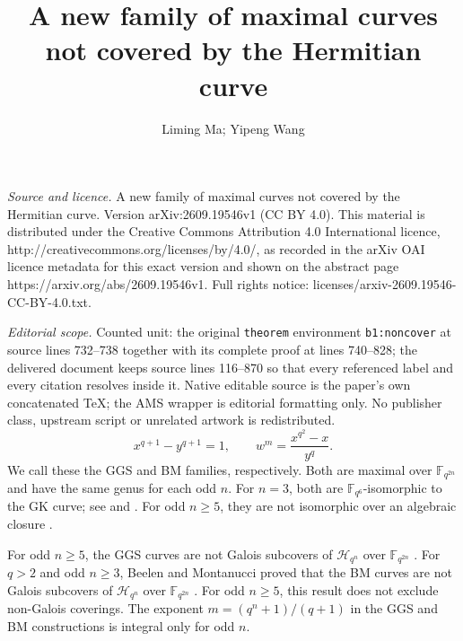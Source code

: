 \documentclass[10pt,a4paper]{amsart}
\numberwithin{equation}{section}
\newcommand{\F}{\mathbb F}
\begin{document}
\title[A new family of maximal curves not covered by the Hermitian ]{A new family of maximal curves not covered by the Hermitian curve}
\author{Liming Ma; Yipeng Wang}
\date{}
\maketitle
\noindent\emph{Source and licence.} A new family of maximal curves not covered by the Hermitian curve. Version arXiv:2609.19546v1 (CC BY 4.0). This material is distributed under the Creative Commons Attribution 4.0 International licence, http://creativecommons.org/licenses/by/4.0/, as recorded in the arXiv OAI licence metadata for this exact version and shown on the abstract page https://arxiv.org/abs/2609.19546v1. Full rights notice: licenses/arxiv-2609.19546-CC-BY-4.0.txt.\par\smallskip
\noindent\textit{Editorial scope.} Counted unit: the original \texttt{theorem} environment \texttt{b1:noncover} at source lines 732--738 together with its complete proof at lines 740--828; the delivered document keeps source lines 116--870 so that every referenced label and every citation resolves inside it. Native editable source is the paper's own concatenated TeX; the AMS wrapper is editorial formatting only. No publisher class, upstream script or unrelated artwork is redistributed.
\begin{equation}
\label{b1:bm-model}
 x^{q+1}-y^{q+1}=1,\qquad w^m=\frac{x^{q^2}-x}{y^q}.
\end{equation}
We call these the GGS and BM families, respectively. Both are
maximal over \(\F_{q^{2n}}\) and have the same genus for each odd
\(n\). For \(n=3\), both are \(\F_{q^6}\)-isomorphic to the
GK curve; see \cite[Remark~2.1]{GGS2010} and
\cite[Section~2]{BM2018}.
For odd \(n\ge5\), they are not isomorphic over an algebraic closure
\cite[Corollary~2.6 and Remark~4.5]{BM2018}.

For odd \(n\ge5\), the GGS curves are not Galois subcovers of
\(\mathcal H_{q^n}\) over \(\F_{q^{2n}}\)
\cite{DM2012,GMZ2016}.
For \(q>2\) and odd \(n\ge3\), Beelen and Montanucci proved that the BM curves are
not Galois subcovers of
\(\mathcal H_{q^n}\) over \(\F_{q^{2n}}\)
\cite[Corollary~2.2]{BM2018}.
For odd \(n\ge5\), this result does not exclude non-Galois coverings.
The exponent \(m=(q^n+1)/(q+1)\) in the GGS and BM
constructions is integral only for odd \(n\).
\end{document}
